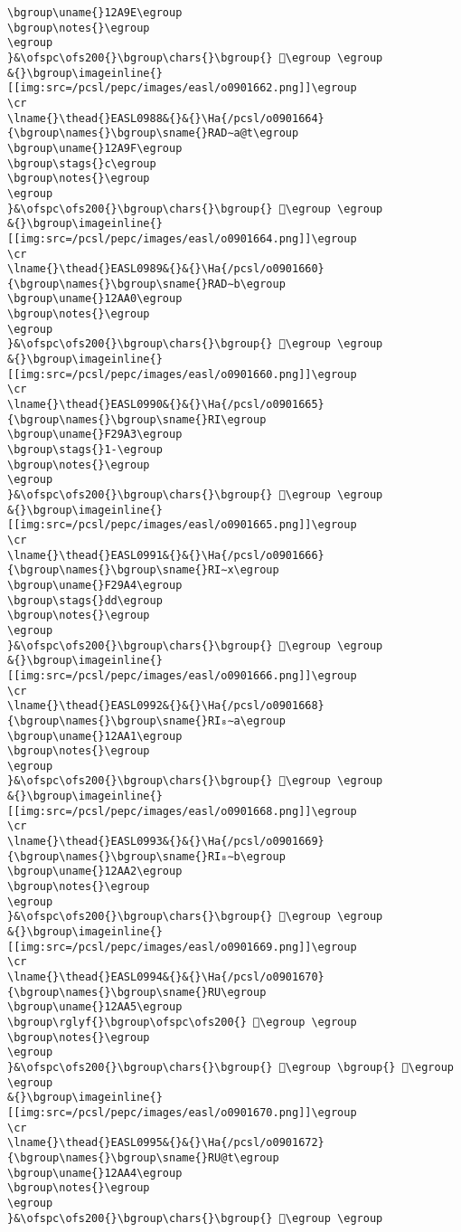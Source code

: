 \begin{verbatim}
\bgroup\uname{}12A9E\egroup
\bgroup\notes{}\egroup
\egroup
}&\ofspc\ofs200{}\bgroup\chars{}\bgroup{} 𒪞\egroup \egroup
&{}\bgroup\imageinline{}[[img:src=/pcsl/pepc/images/easl/o0901662.png]]\egroup
\cr
\lname{}\thead{}EASL0988&{}&{}\Ha{/pcsl/o0901664}{\bgroup\names{}\bgroup\sname{}RAD∼a@t\egroup
\bgroup\uname{}12A9F\egroup
\bgroup\stags{}c\egroup
\bgroup\notes{}\egroup
\egroup
}&\ofspc\ofs200{}\bgroup\chars{}\bgroup{} 𒪟\egroup \egroup
&{}\bgroup\imageinline{}[[img:src=/pcsl/pepc/images/easl/o0901664.png]]\egroup
\cr
\lname{}\thead{}EASL0989&{}&{}\Ha{/pcsl/o0901660}{\bgroup\names{}\bgroup\sname{}RAD∼b\egroup
\bgroup\uname{}12AA0\egroup
\bgroup\notes{}\egroup
\egroup
}&\ofspc\ofs200{}\bgroup\chars{}\bgroup{} 𒪠\egroup \egroup
&{}\bgroup\imageinline{}[[img:src=/pcsl/pepc/images/easl/o0901660.png]]\egroup
\cr
\lname{}\thead{}EASL0990&{}&{}\Ha{/pcsl/o0901665}{\bgroup\names{}\bgroup\sname{}RI\egroup
\bgroup\uname{}F29A3\egroup
\bgroup\stags{}1-\egroup
\bgroup\notes{}\egroup
\egroup
}&\ofspc\ofs200{}\bgroup\chars{}\bgroup{} 󲦣\egroup \egroup
&{}\bgroup\imageinline{}[[img:src=/pcsl/pepc/images/easl/o0901665.png]]\egroup
\cr
\lname{}\thead{}EASL0991&{}&{}\Ha{/pcsl/o0901666}{\bgroup\names{}\bgroup\sname{}RI∼x\egroup
\bgroup\uname{}F29A4\egroup
\bgroup\stags{}dd\egroup
\bgroup\notes{}\egroup
\egroup
}&\ofspc\ofs200{}\bgroup\chars{}\bgroup{} 󲦤\egroup \egroup
&{}\bgroup\imageinline{}[[img:src=/pcsl/pepc/images/easl/o0901666.png]]\egroup
\cr
\lname{}\thead{}EASL0992&{}&{}\Ha{/pcsl/o0901668}{\bgroup\names{}\bgroup\sname{}RI₈∼a\egroup
\bgroup\uname{}12AA1\egroup
\bgroup\notes{}\egroup
\egroup
}&\ofspc\ofs200{}\bgroup\chars{}\bgroup{} 𒪡\egroup \egroup
&{}\bgroup\imageinline{}[[img:src=/pcsl/pepc/images/easl/o0901668.png]]\egroup
\cr
\lname{}\thead{}EASL0993&{}&{}\Ha{/pcsl/o0901669}{\bgroup\names{}\bgroup\sname{}RI₈∼b\egroup
\bgroup\uname{}12AA2\egroup
\bgroup\notes{}\egroup
\egroup
}&\ofspc\ofs200{}\bgroup\chars{}\bgroup{} 𒪢\egroup \egroup
&{}\bgroup\imageinline{}[[img:src=/pcsl/pepc/images/easl/o0901669.png]]\egroup
\cr
\lname{}\thead{}EASL0994&{}&{}\Ha{/pcsl/o0901670}{\bgroup\names{}\bgroup\sname{}RU\egroup
\bgroup\uname{}12AA5\egroup
\bgroup\rglyf{}\bgroup\ofspc\ofs200{} 𒪥\egroup \egroup
\bgroup\notes{}\egroup
\egroup
}&\ofspc\ofs200{}\bgroup\chars{}\bgroup{} 𒪣\egroup \bgroup{} 𒪥\egroup \egroup
&{}\bgroup\imageinline{}[[img:src=/pcsl/pepc/images/easl/o0901670.png]]\egroup
\cr
\lname{}\thead{}EASL0995&{}&{}\Ha{/pcsl/o0901672}{\bgroup\names{}\bgroup\sname{}RU@t\egroup
\bgroup\uname{}12AA4\egroup
\bgroup\notes{}\egroup
\egroup
}&\ofspc\ofs200{}\bgroup\chars{}\bgroup{} 𒪤\egroup \egroup

\end{verbatim}
